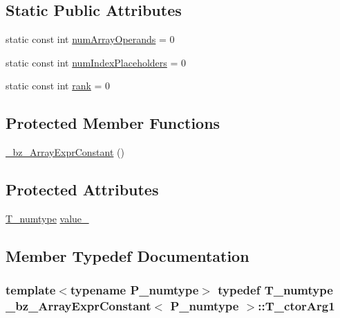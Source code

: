\subsection*{Static Public Attributes}
\begin{DoxyCompactItemize}
\item 
static const int \hyperlink{class__bz__ArrayExprConstant_a32af6b1654ada222276361a74bfb5e19}{num\+Array\+Operands} = 0
\item 
static const int \hyperlink{class__bz__ArrayExprConstant_aa157c75baed33a8bb1c351318c99063a}{num\+Index\+Placeholders} = 0
\item 
static const int \hyperlink{class__bz__ArrayExprConstant_a918d9c3c480581be687fee94fa5d61a3}{rank} = 0
\end{DoxyCompactItemize}
\subsection*{Protected Member Functions}
\begin{DoxyCompactItemize}
\item 
\hyperlink{class__bz__ArrayExprConstant_ad13542b1de462632f5c97b37c1f7770c}{\+\_\+bz\+\_\+\+Array\+Expr\+Constant} ()
\end{DoxyCompactItemize}
\subsection*{Protected Attributes}
\begin{DoxyCompactItemize}
\item 
\hyperlink{class__bz__ArrayExprConstant_a7a9b5e4fa964d73b7f8b31e7977123cb}{T\+\_\+numtype} \hyperlink{class__bz__ArrayExprConstant_a97616e9804652bf4819682979d016865}{value\+\_\+}
\end{DoxyCompactItemize}


\subsection{Member Typedef Documentation}
\hypertarget{class__bz__ArrayExprConstant_ac8551ed06b94b390e044fa0d514cbbe9}{}
\subsubsection[{T\+\_\+ctor\+Arg1}]{\setlength{\rightskip}{0pt plus 5cm}template$<$typename P\+\_\+numtype$>$ typedef {\bf T\+\_\+numtype} {\bf \+\_\+bz\+\_\+\+Array\+Expr\+Constant}$<$ P\+\_\+numtype $>$\+::{\bf T\+\_\+ctor\+Arg1}}\label{class__bz__ArrayExprConstant_ac8551ed06b94b390e044fa0d514cbbe9}
\hypertarget{class__bz__ArrayExprConstant_a00a064bf6ba99a84a9d4ba0c801e17f9}{}
